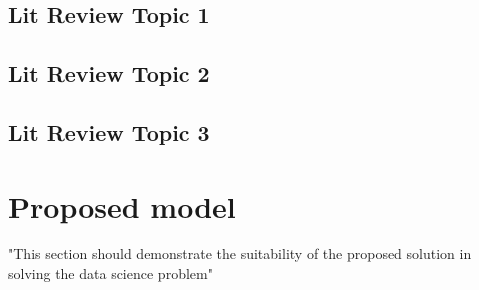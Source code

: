 \documentclass[12pt]{report}
\begin{document}

\section{Lit Review Topic 1}

\section{Lit Review Topic 2}


\section{Lit Review Topic 3}



\chapter{Proposed model}
"This section should demonstrate the suitability of
the proposed solution in solving the data science problem"





\printbibliography
\end{document}
